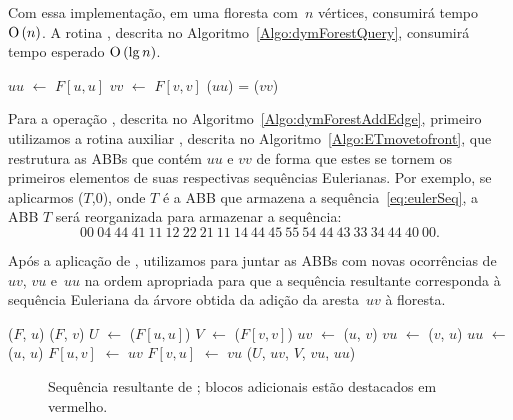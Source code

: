 Com essa implementação, em uma floresta com~$n$ vértices, \dymForestCreate{} consumirá tempo~$\text{O}\left(n\right)$. A rotina \dymForestQuery{}, descrita no Algoritmo~\ref{Algo:dymForestQuery}, consumirá tempo esperado $\text{O}\left(\lg n\right)$.


\begin{algorithm}[htb]
\caption{\dymForestQuery($F$, $u$, $v$)}
\label{Algo:dymForestQuery}
\begin{algorithmic}[1]
\State $uu$ $\gets$ $F[u,u]$
\State $vv$ $\gets$ $F[v,v]$
\State \Return \treapGetRoot($uu$) = \treapGetRoot($vv$)
\end{algorithmic}
\end{algorithm}

Para a operação \dymForestAddEdge{}, descrita no Algoritmo~\ref{Algo:dymForestAddEdge}, primeiro utilizamos a rotina auxiliar \ETmovetofront{}, descrita no Algoritmo~\ref{Algo:ETmovetofront}, que restrutura as ABBs que contém $uu$ e $vv$ de forma que estes se tornem os primeiros elementos de suas respectivas sequências Eulerianas. Por exemplo, se aplicarmos \ETmovetofront($T$,0), onde $T$ é a ABB que armazena a sequência~\eqref{eq:eulerSeq}, a ABB $T$ será reorganizada para armazenar a sequência:
\begin{equation}
00~04~44~41~11~12~22~21~11~14~44~45~55~54~44~43~33~34~44~40~00.\nonumber
\end{equation}

Após a aplicação de \ETmovetofront{}, utilizamos \treapJoin{} para juntar as ABBs com novas ocorrências de $uv$, $vu$ e~$uu$ na ordem apropriada para que a sequência resultante corresponda à sequência Euleriana da árvore obtida da adição da aresta~$uv$ à floresta.

\begin{algorithm}[htb]
\caption{\dymForestAddEdge($F$, $u$, $v$)}
\label{Algo:dymForestAddEdge}
\begin{algorithmic}[1]
\State \ETmovetofront($F$, $u$)
\State \ETmovetofront($F$, $v$)
\State $U$ $\gets$ \treapGetRoot($F[u,u]$)
\State $V$ $\gets$ \treapGetRoot($F[v,v]$)
\State $uv$ $\gets$ \treapCreate($u$, $v$)
\State $vu$ $\gets$ \treapCreate($v$, $u$)
\State $uu$ $\gets$ \treapCreate($u$, $u$)
\State $F[u,v]$ $\gets$ $uv$
\State $F[v,u]$ $\gets$ $vu$
\State \treapJoin($U$, $uv$, $V$, $vu$, $uu$)
\end{algorithmic}
\end{algorithm}
\begin{figure}[htb]
\centering

\caption{Sequência resultante de \dymForestAddEdge{}; blocos adicionais estão destacados em vermelho.}
\label{fig:algorit-link-seqxy}
\end{figure}


